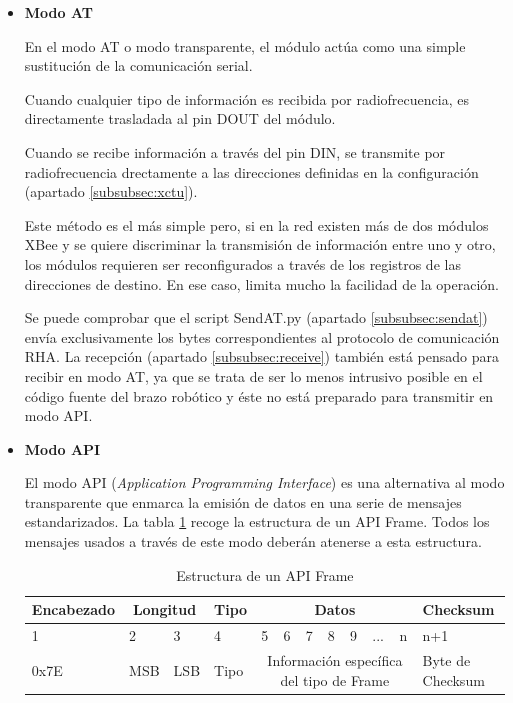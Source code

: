 \begin{itemize}
\item \textbf{Modo AT}

En el modo AT o modo transparente, el módulo actúa como una simple sustitución de la comunicación serial.

Cuando cualquier tipo de información es recibida por radiofrecuencia, es directamente trasladada al pin DOUT del módulo.

Cuando se recibe información a través del pin DIN, se transmite por radiofrecuencia drectamente a las direcciones definidas en la configuración (apartado \ref{subsubsec:xctu}).

Este método es el más simple pero, si en la red existen más de dos módulos XBee y se quiere discriminar la transmisión de información entre uno y otro, los módulos requieren ser reconfigurados a través de los registros de las direcciones de destino. En ese caso, limita mucho la facilidad de la operación.

Se puede comprobar que el script SendAT.py (apartado \ref{subsubsec:sendat}) envía exclusivamente los bytes correspondientes al protocolo de comunicación RHA. La recepción (apartado \ref{subsubsec:receive}) también está pensado para recibir en modo AT, ya que se trata de ser lo menos intrusivo posible en el código fuente del brazo robótico y éste no está preparado para transmitir en modo API.

\item \textbf{Modo API}

El modo API (\textit{Application Programming Interface}) es una alternativa al modo transparente que enmarca la emisión de datos en una serie de mensajes estandarizados. La tabla \ref{tab:APIFrame} recoge la estructura de un API Frame. Todos los mensajes usados a través de este modo deberán atenerse a esta estructura.

\begin{table}[bt]
\begin{center}
\begin{tabular}{|m{20mm}|m{10mm}|m{10mm}|m{10mm}|m{5mm}|m{5mm}|m{5mm}|m{5mm}|m{5mm}|m{5mm}|m{5mm}|m{20mm}|}
\hline
\textbf{Encabezado} & \multicolumn{2}{|c|}{\textbf{Longitud}} & \textbf{Tipo} & \multicolumn{7}{|c|}{\textbf{Datos}} & \textbf{Checksum}\\
\hline
\hline
1 & 2 & 3 & 4 & 5 & 6 & 7 & 8 & 9 & ... & n & n+1\\
\hline
0x7E & MSB & LSB & Tipo & \multicolumn{7}{|c|}{Información específica del tipo de Frame} & Byte de Checksum\\
\hline
\end{tabular}
\end{center}
\caption{Estructura de un API Frame}
\label{tab:APIFrame}
\end{table}


\end{itemize}
